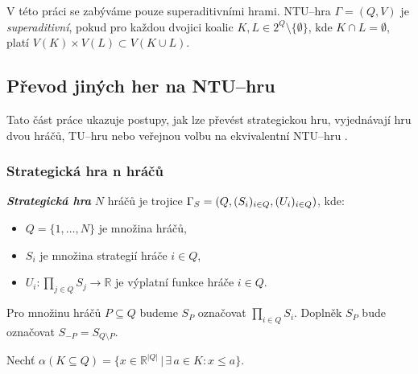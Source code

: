         V této práci se zabýváme pouze superaditivními hrami. NTU--hra $\Gamma = (Q, V)$ je \textit{superaditivní}, pokud pro každou dvojici koalic $K, L \in 2^Q \setminus \{\emptyset\}$, kde $K \cap L = \emptyset$, platí $V(K) \times V(L) \subset V(K \cup L)$.

    \subsection{Převod jiných her na NTU--hru}
        Tato část práce ukazuje postupy, jak lze převést strategickou hru, vyjednávají hru dvou hráčů, TU--hru nebo veřejnou volbu na ekvivalentní NTU--hru \cite{Game_Theory}.

        \subsubsection*{Strategická hra n hráčů}
            \textit{\textbf{Strategická hra}} $N$ hráčů \cite{Hruby2022NCOOP} je trojice $\Gamma_S = (Q, (S_i)_{i\in Q},\\ (U_i)_{i\in Q})$, kde:
            \begin{itemize}
                \item $Q = \{1, \dots, N\}$ je množina hráčů,
                \item $S_i$ je množina strategií hráče $i \in Q$,
                \item $U_i: \prod_{j\in Q}S_j \rightarrow \mathbb{R}$ je výplatní funkce hráče $i \in Q$.
            \end{itemize}

            Pro množinu hráčů $P \subseteq Q$ budeme $S_P$ označovat $\prod_{i \in Q}S_i$. Doplněk $S_P$ bude označovat $S_{-P} = S_{Q\setminus P}$.

            Nechť $\alpha(K \subseteq Q) = \{x \in \mathbb{R}^{|Q|}\,|\, \exists\, a \in K:  x \leqslant a\}$.

